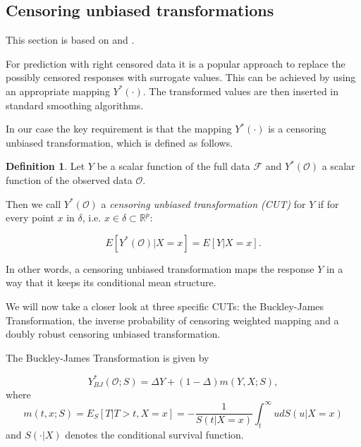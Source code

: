 \documentclass[12pt, a4paper]{article}
\theoremstyle{definition}
\newtheorem{Definition}{Definition}[section]
\theoremstyle{plain}
\numberwithin{equation}{section}
\numberwithin{figure}{section}
\numberwithin{table}{section}
\begin{document}
	\subsection{Censoring unbiased transformations}\label{sec:drtrafo}
	This section is based on \citet*{culs} and \citet*{drcut}.
	
	
	For prediction with right censored data it is a popular approach to replace the possibly censored responses with surrogate values.
	This can be achieved by using an appropriate mapping $Y^*(\cdot)$.
	The transformed values are then inserted in standard smoothing algorithms.
	
	In our case the key requirement is that the mapping $Y^*(\cdot)$ is a censoring unbiased transformation, which is defined as follows.
	
	\begin{Definition}
	Let $Y$ be a scalar function of the full data $\mathcal{F}$ and $Y^*(\mathcal{O})$ a scalar function of the observed data $\mathcal{O}$.
	
	Then we call $Y^*(\mathcal{O})$ a \textit{censoring unbiased transformation (CUT)} for $Y$ if for every point $x$ in $\delta$, i.e. $x \in \delta \subset \mathbb{R}^p$:

	\begin{equation*}
	E[Y^*(\mathcal{O}) \vert X = x] = E[Y \vert X=x].
	\end{equation*}
	\end{Definition}

	In other words, a censoring unbiased transformation maps the response $Y$ in a way that it keeps its conditional mean structure.
	
	We will now take a closer look at three specific CUTs: the Buckley-James Transformation, the inverse probability of censoring weighted mapping and a doubly robust censoring unbiased transformation.
	
	The Buckley-James Transformation is given by
	
	\begin{equation}\label{eq:bjtrafo}
		Y_{BJ}^* (\mathcal{O}; S) = \Delta Y + (1-\Delta)m(Y,X;S),
	\end{equation}
	where
	\begin{equation}\label{eq:condmean}
		m(t,x;S) = E_S[T \vert T > t, X=x] = -\frac{1}{S(t\vert X=x)} \int_t^{\infty} u dS(u\vert X=x)
	\end{equation}%
	and $S(\cdot\vert X)$ denotes the conditional survival function.
	
\end{document}
